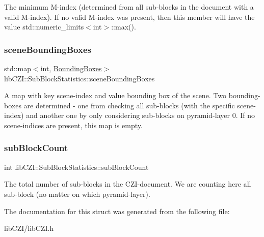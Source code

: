 The minimum M-\/index (determined from all sub-\/blocks in the document with a valid M-\/index). If no valid M-\/index was present, then this member will have the value std\+::numeric\+\_\+limits$<$int$>$\+::max(). \mbox{\label{structlib_c_z_i_1_1_sub_block_statistics_ab02ae7bcd25f34008ec9d5afa8a4efec}} 
\subsubsection{\texorpdfstring{scene\+Bounding\+Boxes}{sceneBoundingBoxes}}
{\footnotesize\ttfamily std\+::map$<$int, \hyperlink{structlib_c_z_i_1_1_bounding_boxes}{Bounding\+Boxes}$>$ lib\+C\+Z\+I\+::\+Sub\+Block\+Statistics\+::scene\+Bounding\+Boxes}

A map with key scene-\/index and value bounding box of the scene. Two bounding-\/boxes are determined -\/ one from checking all sub-\/blocks (with the specific scene-\/index) and another one by only considering sub-\/blocks on pyramid-\/layer 0. If no scene-\/indices are present, this map is empty. \mbox{\label{structlib_c_z_i_1_1_sub_block_statistics_a2507642d2007c30f4984cc2618203534}} 
\subsubsection{\texorpdfstring{sub\+Block\+Count}{subBlockCount}}
{\footnotesize\ttfamily int lib\+C\+Z\+I\+::\+Sub\+Block\+Statistics\+::sub\+Block\+Count}

The total number of sub-\/blocks in the C\+Z\+I-\/document. We are counting here all sub-\/block (no matter on which pyramid-\/layer). 

The documentation for this struct was generated from the following file\+:\begin{DoxyCompactItemize}
\item 
lib\+C\+Z\+I/lib\+C\+Z\+I.\+h\end{DoxyCompactItemize}
